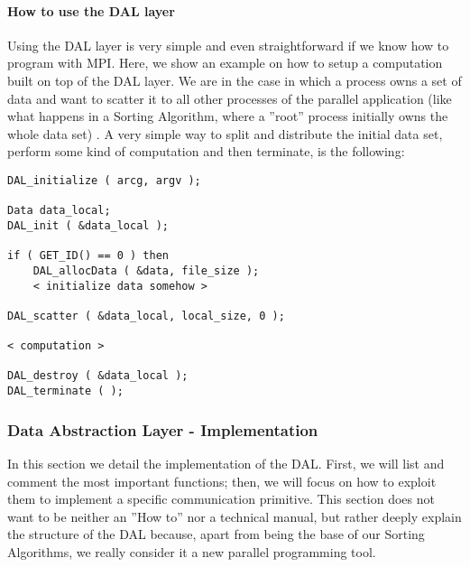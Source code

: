 \paragraph{How to use the DAL layer} Using the DAL layer is very simple and even straightforward if we know how to program with MPI. Here, we show an example on how to setup a computation built on top of the DAL layer. We are in the case in which a process owns a set of data and want to scatter it to all other processes of the parallel application (like what happens in a Sorting Algorithm, where a ''root'' process initially owns the whole data set) . A very simple way to split and distribute the initial data set, perform some kind of computation and then terminate, is the following:
\begin{lstlisting}
DAL_initialize ( arcg, argv );

Data data_local;
DAL_init ( &data_local );

if ( GET_ID() == 0 ) then
	DAL_allocData ( &data, file_size );
	< initialize data somehow >
	
DAL_scatter ( &data_local, local_size, 0 );

< computation >

DAL_destroy ( &data_local );	
DAL_terminate ( );
\end{lstlisting}


\subsubsection{Data Abstraction Layer - Implementation}
\label{DAL-impl}
In this section we detail the implementation of the DAL. First, we will list and comment the most important functions; then, we will focus on how to exploit them to implement a specific communication primitive. This section does not want to be neither an ''How to'' nor a technical manual, but rather deeply explain the structure of the DAL because, apart from being the base of our Sorting Algorithms, we really consider it a new parallel programming tool.

